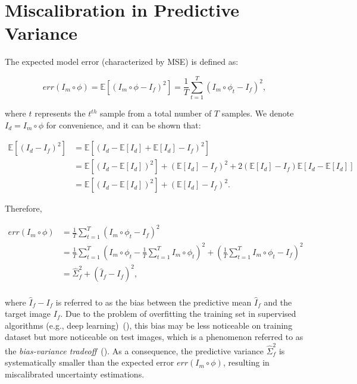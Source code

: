 \documentclass[times,twocolumn,final]{elsarticle}
\begin{document}
\section{Miscalibration in Predictive Variance}
\label{app:mis_cal}
The expected model error (characterized by MSE) is defined as:
\begin{linenomath}
\begin{equation}
\label{eqn:exp_err}
    err(I_m\circ\phi) = \mathbb{E}\left[(I_m\circ\phi-I_f)^2\right]=\frac{1}{T}\sum^T_{t=1}\left(I_m\circ\phi_t - I_f\right)^2,
\end{equation}
\end{linenomath}
where $t$ represents the $t^{th}$ sample from a total number of $T$ samples. We denote $I_d=I_m\circ\phi$ for convenience, and it can be shown that:
\begin{linenomath}
\begin{equation}
    \begin{split}
        \mathbb{E}\left[(I_d-I_f)^2\right]&=\mathbb{E}\left[(I_d-\mathbb{E}[I_d]+\mathbb{E}[I_d]-I_f)^2\right]\\
        &=\mathbb{E}\left[\left(I_d-\mathbb{E}[I_d]\right)^2\right]+\left(\mathbb{E}[I_d]-I_f\right)^2+ 2(\mathbb{E}[I_d]-I_f)\mathbb{E}\left[I_d-\mathbb{E}[I_d]\right]\\
        &=\mathbb{E}\left[\left(I_d-\mathbb{E}[I_d]\right)^2\right]+\left(\mathbb{E}[I_d]-I_f\right)^2.
    \end{split}
\end{equation}
\end{linenomath}
Therefore,
\begin{linenomath}
\begin{equation}
\label{eqn:exp_err_var}
\begin{split}
     err(I_m\circ\phi)&=\frac{1}{T}\sum^T_{t=1}\left(I_m\circ\phi_t - I_f\right)^2\\
     &=\frac{1}{T}\sum^T_{t=1}\left(I_m\circ\phi_t - \frac{1}{T}\sum^T_{t=1}I_m\circ\phi_t\right)^2+\left(\frac{1}{T}\sum^T_{t=1}I_m\circ\phi_t-I_f\right)^2\\
     &=\hat{\Sigma}^2_f+\left(\hat{I}_f-I_f\right)^2,\\
\end{split}
\end{equation}
\end{linenomath}
where $\hat{I}_f-I_f$ is referred to as the bias between the predictive mean $\hat{I}_f$ and the target image $I_f$. Due to the problem of overfitting the training set in supervised algorithms (e.g., deep learning)~(\cite{bishop2006pattern}), this bias may be less noticeable on training dataset but more noticeable on test images, which is a phenomenon referred to as the \textit{bias-variance tradeoff}~(\cite{friedman2017elements}). As a consequence, the predictive variance $\hat{\Sigma}^2_f$ is systematically smaller than the expected error $err(I_m\circ\phi)$, resulting in miscalibrated uncertainty estimations.
\newpage
\end{document}

